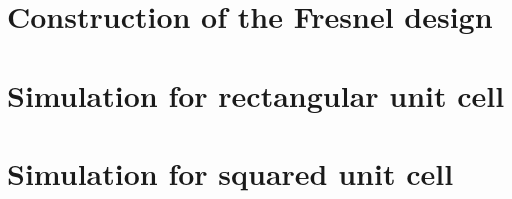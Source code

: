\section{Construction of the Fresnel design}

\section{Simulation for rectangular unit cell}

\section{Simulation for squared unit cell}
